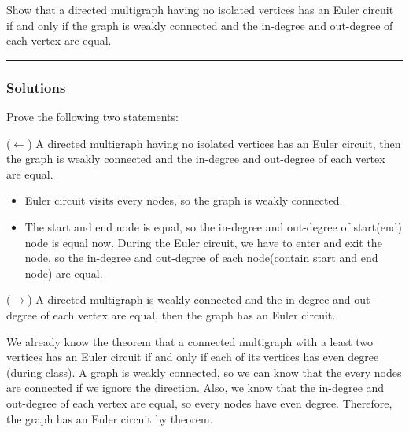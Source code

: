 \newpage
\begin{question}
Show that a directed multigraph having no isolated vertices has an Euler circuit if and only if the graph is weakly connected and the in-degree and out-degree of each vertex are equal.
\end{question}

\par\noindent\rule{\textwidth}{0.5pt}

\subsubsection*{Solutions} Prove the following two statements:\bigskip

\noindent
($\leftarrow$) A directed multigraph having no isolated vertices has an Euler circuit, then the graph is weakly connected and the in-degree and out-degree of each vertex are equal.

\begin{itemize}
    \item Euler circuit visits every nodes, so the graph is weakly connected.
    \item The start and end node is equal, so the in-degree and out-degree of start(end) node is equal now. During the Euler circuit, we have to enter and exit the node, so the in-degree and out-degree of each node(contain start and end node) are equal.
\end{itemize}

\bigskip\noindent
($\rightarrow$) A directed multigraph is weakly connected and the in-degree and out-degree of each vertex are equal, then the graph has an Euler circuit.

\bigskip\noindent
We already know the theorem that a connected multigraph with a least two vertices has an Euler circuit if and only if each of its vertices has even degree (during class). A graph is weakly connected, so we can know that the every nodes are connected if we ignore the direction. Also, we know that the in-degree and out-degree of each vertex are equal, so every nodes have even degree. Therefore, the graph has an Euler circuit by theorem.
